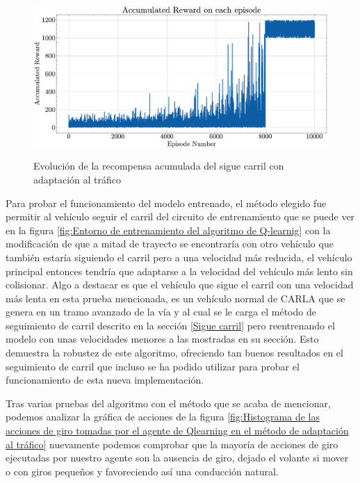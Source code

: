   \begin{figure}[h]
    \centering
    \includegraphics[height=6cm]{imagenes/cap4/adaptacion_trafico_qlearning/reward.pdf}
    \caption{Evolución de la recompensa acumulada del sigue carril con adaptación al tráfico}
    \label{fig:Evolución de la recompensa acumulada del sigue carril con adaptación de velocidad en función del tráfico}
\end{figure}

\bigskip

Para probar el funcionamiento  del modelo entrenado, el método elegido fue permitir al vehículo seguir el carril del circuito de entrenamiento que se puede ver en la figura \ref{fig:Entorno de entrenamiento del algoritmo de Q-learnig} con la modificación de que a mitad de trayecto se encontraría con otro vehículo que también estaría siguiendo el carril pero a una velocidad más reducida, el vehículo principal entonces tendría que adaptarse a la velocidad del vehículo más lento sin colisionar. Algo a destacar es que el vehículo que sigue el carril con una velocidad más lenta en esta prueba mencionada, es un vehículo normal de CARLA que se genera en un tramo avanzado de la vía y al cual se le carga el método de seguimiento de carril descrito en la sección \ref{Sigue carril} pero reentrenando el modelo con unas velocidades menores a las mostradas en su sección. Esto demuestra la robustez de este algoritmo, ofreciendo tan buenos resultados en el seguimiento de carril que incluso se ha podido utilizar para probar el funcionamiento de esta nueva implementación.

\bigskip

Tras varias pruebas del algoritmo con el método que se acaba de mencionar, podemos analizar la gráfica de acciones de la figura \ref{fig:Histograma de las acciones de giro tomadas por el agente de Qlearning en el método de adaptación al tráfico} nuevamente podemos comprobar que la mayoría de acciones de giro ejecutadas por nuestro agente son la ausencia de giro, dejado el volante si mover o con giros pequeños y favoreciendo así una conducción natural.


